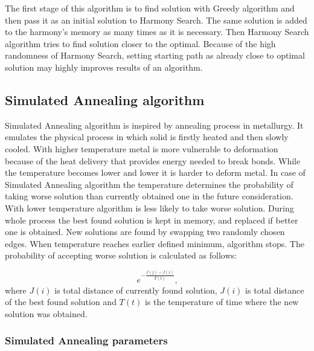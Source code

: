 \documentclass[titlepage]{article}
\begin{document}
The first stage of this algorithm is to find solution with Greedy algorithm and then pass it as an initial solution to Harmony Search. The same solution is added to the harmony's memory as many times as it is necessary. Then Harmony Search algorithm tries to find solution closer to the optimal. Because of the high randomness of Harmony Search, setting starting path as already close to optimal solution may highly improves results of an algorithm.

\subsection{Simulated Annealing algorithm}

Simulated Annealing algorithm is inspired by annealing process in metallurgy. It emulates the physical process in which solid is firstly heated and then slowly cooled. With higher temperature metal is more vulnerable to deformation because of the heat delivery that provides energy needed to break bonds. While the temperature becomes lower and lower it is harder to deform metal. In case of Simulated Annealing algorithm the temperature determines the probability of taking worse solution than currently obtained one in the future consideration. With lower temperature algorithm is less likely to take worse solution. During whole process the best found solution is kept in memory, and replaced if better one is obtained. New solutions are found by swapping two randomly chosen edges. When temperature reaches earlier defined minimum, algorithm stops. The probability of accepting worse solution is calculated as follows:

\[e^{-\frac{J(j)-J(i)}{T(t)}}\mbox{,}\]
	where $J(i)$ is total distance of currently found solution, $J(i)$ is total distance of the best found solution and $T(t)$ is the temperature of time where the new solution was obtained.


\subsubsection{Simulated Annealing parameters}
\end{document}
